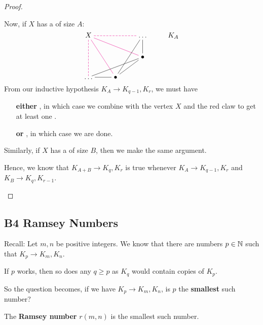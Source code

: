 \documentclass[12pt]{article}
\begin{document}
\begin{proof}
\begin{enumerate}[align=left]
        Now, if $X$ has a  of size $A$:
        \[\begin{tikzcd}[ampersand replacement=\&,cramped]
            X \&\& \dots \& {K_A} \\
            \&\& \bullet \\
            \dots \& \bullet
            \arrow[color=magenta, dashed, no head, from=1-1, to=1-3]
            \arrow[color=magenta, no head, from=1-1, to=2-3]
            \arrow[color=magenta, no head, from=1-1, to=3-2]
            \arrow[color=magenta, dashed, no head, from=1-1, to=3-1]
            \arrow[no head, from=1-3, to=2-3]
            \arrow[no head, from=1-3, to=3-2]
            \arrow[no head, from=2-3, to=3-2]
            \arrow[no head, from=3-1, to=3-2]
            \arrow[no head, from=3-1, to=2-3]
        \end{tikzcd}\]
        From our inductive hypothesis $K_A\to K_{q-1},K_r$, we must have \begin{itemize}[align=left]
            \item[\textbf{either}] , in which case we combine with the vertex $X$ and the red claw to get at least one .
            \item[\textbf{or}] , in which case we are done. 
        \end{itemize}
        Similarly, if $X$ has a  of size $B$, then we make the same argument.
        \vspace{0.2in}
        
        Hence, we know that $K_{A+B}\to K_q,K_r$ is true whenever $K_A\to K_{q-1},K_r$ and $K_B\to K_{q},K_{r-1}$.
    \end{enumerate}
\end{proof}

\subsection{B4 Ramsey Numbers}
Recall: Let $m,n$ be positive integers. We know that there are numbers $p\in \mathbb{N}$ such that $K_p\to K_m,K_n$.

\rmk If $p$ works, then so does any $q\geq p$ as $K_q$ would contain copies of $K_p$.

So the question becomes, if we have $K_p\to K_m,K_n$, is $p$ the \textbf{smallest} such number?

 The \textbf{Ramsey number} $r(m,n)$ is the smallest such number.
\end{document}
